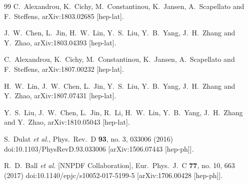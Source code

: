 \begin{thebibliography}{99}
  C.~Alexandrou, K.~Cichy, M.~Constantinou, K.~Jansen, A.~Scapellato and F.~Steffens,
  arXiv:1803.02685 [hep-lat].


  J.~W.~Chen, L.~Jin, H.~W.~Lin, Y.~S.~Liu, Y.~B.~Yang, J.~H.~Zhang and Y.~Zhao,
  arXiv:1803.04393 [hep-lat].


  C.~Alexandrou, K.~Cichy, M.~Constantinou, K.~Jansen, A.~Scapellato and F.~Steffens,
  arXiv:1807.00232 [hep-lat].


  H.~W.~Lin, J.~W.~Chen, L.~Jin, Y.~S.~Liu, Y.~B.~Yang, J.~H.~Zhang and Y.~Zhao,
  arXiv:1807.07431 [hep-lat].

  Y.~S.~Liu, J.~W.~Chen, L.~Jin, R.~Li, H.~W.~Lin, Y.~B.~Yang, J.~H.~Zhang and Y.~Zhao,
  arXiv:1810.05043 [hep-lat].


  S.~Dulat {\it et al.},
  Phys.\ Rev.\ D {\bf 93}, no. 3, 033006 (2016)
  doi:10.1103/PhysRevD.93.033006
  [arXiv:1506.07443 [hep-ph]].


  R.~D.~Ball {\it et al.} [NNPDF Collaboration],
  Eur.\ Phys.\ J.\ C {\bf 77}, no. 10, 663 (2017)
  doi:10.1140/epjc/s10052-017-5199-5
  [arXiv:1706.00428 [hep-ph]].



\end{thebibliography}
